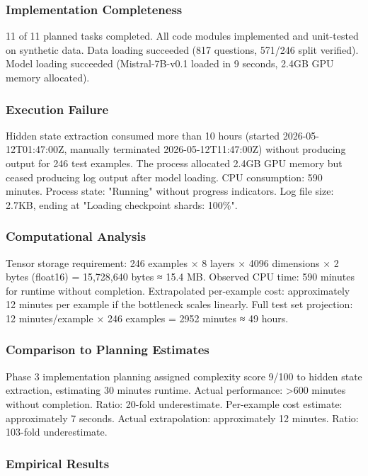 
\subsubsection{Implementation Completeness}

11 of 11 planned tasks completed. All code modules implemented and unit-tested on synthetic data. Data loading succeeded (817 questions, 571/246 split verified). Model loading succeeded (Mistral-7B-v0.1 loaded in 9 seconds, 2.4GB GPU memory allocated).

\subsubsection{Execution Failure}

Hidden state extraction consumed more than 10 hours (started 2026-05-12T01:47:00Z, manually terminated 2026-05-12T11:47:00Z) without producing output for 246 test examples. The process allocated 2.4GB GPU memory but ceased producing log output after model loading. CPU consumption: 590 minutes. Process state: "Running" without progress indicators. Log file size: 2.7KB, ending at "Loading checkpoint shards: 100\%".

\subsubsection{Computational Analysis}

Tensor storage requirement: 246 examples × 8 layers × 4096 dimensions × 2 bytes (float16) = 15,728,640 bytes ≈ 15.4 MB. Observed CPU time: 590 minutes for runtime without completion. Extrapolated per-example cost: approximately 12 minutes per example if the bottleneck scales linearly. Full test set projection: 12 minutes/example × 246 examples = 2952 minutes ≈ 49 hours.

\subsubsection{Comparison to Planning Estimates}

Phase 3 implementation planning assigned complexity score 9/100 to hidden state extraction, estimating 30 minutes runtime. Actual performance: >600 minutes without completion. Ratio: 20-fold underestimate. Per-example cost estimate: approximately 7 seconds. Actual extrapolation: approximately 12 minutes. Ratio: 103-fold underestimate.

\subsubsection{Empirical Results}

